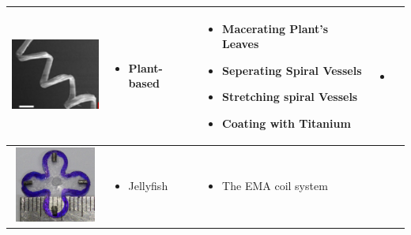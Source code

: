 \documentclass[12pt,a4paper,titlepage]{report}
\begin{document}
\begin{table}[h!]
\begin{tabular}{ c  m{3cm}  m{4.3cm} m{3cm} }
 \begin{minipage}{.3\textwidth}
      \includegraphics[width=\linewidth, height=25mm]{plant_ta}
    \end{minipage}
    &
      \begin{itemize}
        \item Plant-based
      
      \end{itemize}
    & 
      \begin{itemize}
        \item Macerating Plant\rq{}s Leaves
	\item Seperating Spiral Vessels
	\item Stretching spiral Vessels
	\item Coating with Titanium

      \end{itemize}
	&
	   \begin{itemize}
        \item \citep{gao2013bioinspired}
   
      \end{itemize}
    \\ \hline


 \begin{minipage}{.3\textwidth}
      \includegraphics[width=\linewidth, height=25mm]{Jelly}
    \end{minipage}
    &
      \begin{itemize}
        \item Jellyfish
     
      \end{itemize}
    & 
      \begin{itemize}
        \item The EMA coil system
     

\end{itemize}
\end{tabular}
\end{table}
\end{document}
